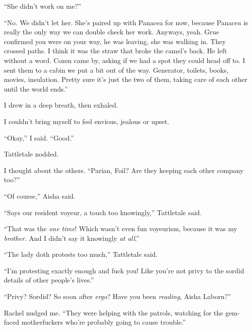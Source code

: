 ``She didn't work on me?''



``No.  We didn't let her.  She's paired up with Panacea for now, because Panacea is really the only way we can double check her work.  Anyways, yeah.  Grue confirmed you were on your way, he was leaving, she was walking in.  They crossed paths.  I think it was the straw that broke the camel's back.  He left without a word.  Cozen came by, asking if we had a spot they could head off to.  I sent them to a cabin we put a bit out of the way.  Generator, toilets, books, movies, insulation.  Pretty sure it's just the two of them, taking care of each other until the world ends.''



I drew in a deep breath, then exhaled.



I couldn't bring myself to feel envious, jealous or upset.



``Okay,'' I said.  ``Good.''



Tattletale nodded.



I thought about the others.  ``Parian, Foil?  Are they keeping each other company too?''



``Of course,'' Aisha said.



``Says our resident voyeur, a touch too knowingly,'' Tattletale said.



``That was the \emph{one time}!  Which wasn't even fun voyeurism, because it was my \emph{brother}.  And I didn't say it knowingly \emph{at all}.''



``The lady doth protests too much,'' Tattletale said.



``I'm protesting exactly enough and fuck you!  Like you're not privy to the sordid details of other people's lives.''



``Privy?  Sordid?  So soon after \emph{ergo}?  Have you been \emph{reading}, Aisha Laborn?''



Rachel nudged me.  ``They were helping with the patrols, watching for the gem-faced motherfuckers who're probably going to cause trouble.''




